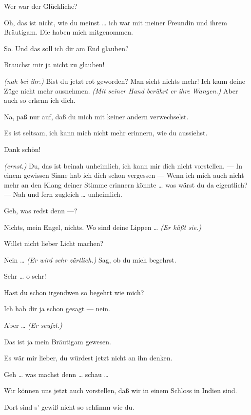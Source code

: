 \documentclass[
	final,
	a4paper,
	ngerman,
	mpinclude = true, %
	twoside = true,
	open = right,
	cleardoublepage = plain,
	DIV = 13,
	BCOR = 1cm,
	titlepage = firstiscover,
	]{scrbook}
\newcommand{\marginnote}[1]{\marginpar{\singlespacing\raggedright\footnotesize#1}}
\newcommand{\direction}[1]{\textit{(#1)}}
\newcommand{\thecharacter}[1]{\textup{\textsc{#1}}\xspace}
\newcommand{\thesuesse}{\thecharacter{Lola}}
\newcommand{\thedichter}{\thecharacter{Robert Bibitz}}
\newcommand{\character}[1]{\item[#1:]}
\newcommand{\suesse}{\character{\thesuesse}}
\newcommand{\dichter}{\character{\thedichter}}
\begin{document}
\begin{play}
	\dichter
	Wer war der Glückliche?

	\suesse
	Oh, das ist nicht, wie du meinst \ldots{} ich war mit meiner Freundin und ihrem Bräutigam. Die haben mich mitgenommen.

	\dichter
	So. Und das soll ich dir am End glauben?

	\suesse
	Brauchst mir ja nicht zu glauben!

	\dichter
	\direction{nah bei ihr.} Bist du jetzt rot geworden? Man sieht nichts mehr! Ich kann deine Züge nicht mehr ausnehmen. \direction{Mit seiner Hand berührt er ihre Wangen.} Aber auch so erkenn ich dich.

	\suesse
	Na, paß nur auf, daß du mich mit keiner andern verwechselst.

	\dichter
	Es ist seltsam, ich kann mich nicht mehr erinnern, wie du aussiehst.

	\suesse
	Dank schön!

	\dichter
	\direction{ernst.} Du, das ist beinah unheimlich, ich kann mir dich nicht vorstellen. --- In einem gewissen Sinne hab ich dich schon vergessen --- Wenn ich mich auch nicht mehr an den Klang deiner Stimme erinnern könnte \ldots{} was wärst du da eigentlich? --- Nah und fern zugleich \ldots{} unheimlich.

	\marginnote{\enquote{Digga, was labersch du?}}
	\suesse
	Geh, was redst denn ---?

	\dichter
	Nichts, mein Engel, nichts. Wo sind deine Lippen \ldots{} \direction{Er küßt sie.}

	\suesse
	Willst nicht lieber Licht machen?

	\dichter
	Nein \ldots{} \direction{Er wird sehr zärtlich.} Sag, ob du mich begehrst.

	\suesse
	Sehr \ldots{} o sehr!

	\dichter
	Hast du schon irgendwen so begehrt wie mich?

	\suesse
	Ich hab dir ja schon gesagt --- nein.

	\dichter
	Aber \ldots{} \direction{Er seufzt.}

	\suesse
	Das ist ja mein Bräutigam gewesen.

	\dichter
	Es wär mir lieber, du würdest jetzt nicht an ihn denken.

	\suesse
	Geh \ldots{} was machst denn \ldots{} schau \ldots{}

	\dichter
	Wir können uns jetzt auch vorstellen, daß wir in einem Schloss in Indien sind.

	\suesse
	Dort sind s' gewiß nicht so schlimm wie du.


\end{play}
\end{document}

